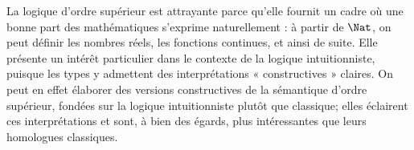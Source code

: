 \documentclass[../../../include/open-logic-section]{subfiles}
\begin{document}
La logique d'ordre supérieur est attrayante parce qu'elle fournit un
cadre où une bonne part des mathématiques s'exprime naturellement :
à partir de $\Nat$, on peut définir les nombres réels, les fonctions
continues, et ainsi de suite. Elle présente un intérêt particulier
dans le contexte de la logique intuitionniste, puisque les types y
admettent des interprétations « constructives » claires. On peut
en effet élaborer des versions constructives de la sémantique d'ordre
supérieur, fondées sur la logique intuitionniste plutôt que classique;
elles éclairent ces interprétations et sont, à bien des égards, plus
intéressantes que leurs homologues classiques.
\end{document}
